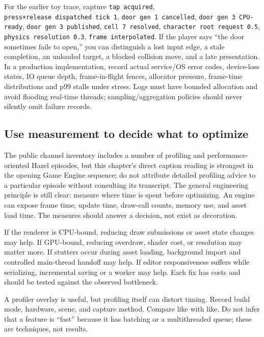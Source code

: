For the earlier toy trace, capture \texttt{tap\ acquired}, \texttt{press+release\ dispatched\ tick\ 1}, \texttt{door\ gen\ 1\ cancelled}, \texttt{door\ gen\ 3\ CPU-ready}, \texttt{door\ gen\ 3\ published}, \texttt{cell\ 7\ resolved}, \texttt{character\ root\ request\ 0.5}, \texttt{physics\ resolution\ 0.3}, \texttt{frame\ interpolated}. If the player says ``the door sometimes fails to open,'' you can distinguish a lost input edge, a stale completion, an unloaded target, a blocked collision move, and a late presentation. In a production implementation, record actual service/OS error codes, device-loss states, IO queue depth, frame-in-flight fences, allocator pressure, frame-time distributions and p99 stalls under stress. Logs must have bounded allocation and avoid flooding real-time threads; sampling/aggregation policies should never silently omit failure records.

\subsection{Use measurement to decide what to optimize}\label{06-engine-ii-ch041-use-measurement-to-decide-what-to-optimize}

The public channel inventory includes a number of profiling and performance-oriented Hazel episodes, but this chapter's direct caption reading is strongest in the opening Game Engine sequence; do not attribute detailed profiling advice to a particular episode without consulting its transcript. The general engineering principle is still clear: measure where time is spent before optimizing. An engine can expose frame time, update time, draw-call counts, memory use, and asset load time. The measures should answer a decision, not exist as decoration.

If the renderer is CPU-bound, reducing draw submissions or asset state changes may help. If GPU-bound, reducing overdraw, shader cost, or resolution may matter more. If stutters occur during asset loading, background import and controlled main-thread handoff may help. If editor responsiveness suffers while serializing, incremental saving or a worker may help. Each fix has costs and should be tested against the observed bottleneck.

A profiler overlay is useful, but profiling itself can distort timing. Record build mode, hardware, scene, and capture method. Compare like with like. Do not infer that a feature is ``fast'' because it has batching or a multithreaded queue; these are techniques, not results.


